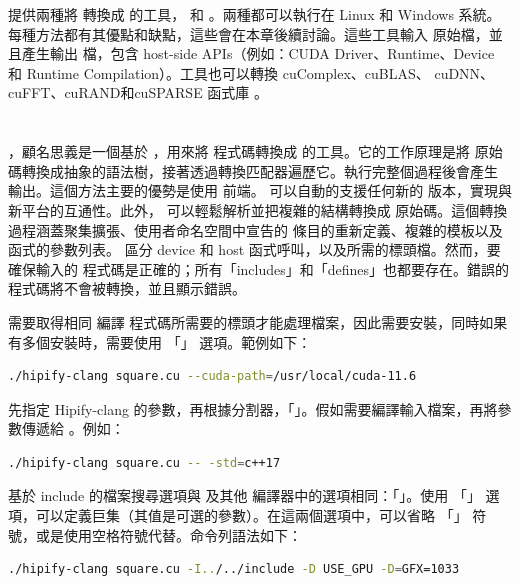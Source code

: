  提供兩種將  轉換成  的工具， 和 。兩種都可以執行在 Linux 和 Windows 系統。每種方法都有其優點和缺點，這些會在本章後續討論。這些工具輸入  原始檔，並且產生輸出  檔，包含 host-side APIs（例如：CUDA Driver、Runtime、Device 和 Runtime Compilation）。工具也可以轉換 cuComplex、cuBLAS、 cuDNN、cuFFT、cuRAND和cuSPARSE 函式庫 \cite{amd2021hip-supported-api}。
\\ \\ 
\\ ，顧名思義是一個基於 ，用來將  程式碼轉換成  的工具。它的工作原理是將  原始碼轉換成抽象的語法樹\cite{llvm2022abstract}，接著透過轉換匹配器遍歷它。執行完整個過程後會產生  輸出。這個方法主要的優勢是使用  前端。 可以自動的支援任何新的  版本，實現與新平台的互通性。此外， 可以輕鬆解析並把複雜的結構轉換成  原始碼。這個轉換過程涵蓋聚集擴張、使用者命名空間中宣告的  條目的重新定義、複雜的模板以及函式的參數列表。 區分 device 和 host 函式呼叫，以及所需的標頭檔。然而，要確保輸入的  程式碼是正確的；所有「includes」和「defines」也都要存在。錯誤的程式碼將不會被轉換，並且顯示錯誤。

 需要取得相同  編譯  程式碼所需要的標頭才能處理檔案，因此需要安裝，同時如果有多個安裝時，需要使用 「」 選項。範例如下：

\begin{lstlisting}[language=bash]
./hipify-clang square.cu --cuda-path=/usr/local/cuda-11.6
\end{lstlisting}

先指定 Hipify-clang 的參數，再根據分割器，「\bold{\code{--}}」。假如需要編譯輸入檔案，再將參數傳遞給 。例如：

\begin{lstlisting}[language=bash]
./hipify-clang square.cu -- -std=c++17
\end{lstlisting}

基於 include 的檔案搜尋選項與  及其他 編譯器中的選項相同：「」。使用 「」 選項，可以定義巨集（其值是可選的參數）。在這兩個選項中，可以省略 「\bold{=}」 符號，或是使用空格符號代替。命令列語法如下：

\begin{lstlisting}[language=bash]
./hipify-clang square.cu -I../../include -D USE_GPU -D=GFX=1033
\end{lstlisting}

